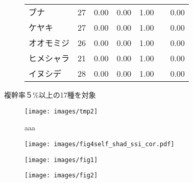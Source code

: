 \documentclass[a0, 30pt, plainboxedsections, draft]{sciposter} %
\renewcommand{\baselinestretch}{1.2}
\begin{document}
\begin{multicols}{2}
\begin{mdframed}[style=subsection.frame,frametitle={\textbf{\huge{\ding{192}}\LARGE{25種の株構造は種間で大きく異なる}}}]
\begin{figure}
\begin{minipage}{0.5\hsize}
\begin{table}
{\begin{tabular}{llrrrr}
\rowcolor{Orange1!30}ブナ &  27 & 0.00 & 0.00 & 1.00 & 0.00 \\ 
\rowcolor{Orange1!30}ケヤキ &  27 & 0.00 & 0.00 & 1.00 & 0.00 \\ 
\rowcolor{Orange1!30}オオモミジ &  26 & 0.00 & 0.00 & 1.00 & 0.00 \\ 
\rowcolor{Orange1!30}ヒメシャラ &  21 & 0.00 & 0.00 & 1.00 & 0.00 \\ 
\rowcolor{Orange1!30}イヌシデ &  28 & 0.00 & 0.00 & 1.00 & 0.00　 \\ 
   \hline
\end{tabular}}
\end{table}
 \end{minipage}
\end{figure}


\end{mdframed}

\renewcommand{\baselinestretch}{0.8}
\begin{mdframed}[style=subsection.frame,frametitle=\textbf{\huge{\ding{194}}\LARGE{萌芽性が強い種ほど自己被陰率が下がる}}]
\renewcommand{\baselinestretch}{1.2}

複幹率５\%以上の17種を対象

\begin{figure}
 \begin{minipage}{0.3\hsize}
  \centering
   \texttt{[image: images/tmp2]}
   
   aaa
 \end{minipage}
 \begin{minipage}{0.67\hsize}
  \centering
   \texttt{[image: images/fig4self\_shad\_ssi\_cor.pdf]}   
 \end{minipage}
\end{figure}

\end{mdframed}

\columnbreak
\renewcommand{\baselinestretch}{0.8}
\begin{mdframed}[style=subsection.frame,frametitle=\textbf{\huge{\ding{193}}\LARGE{萌芽性が強くなるほど樹高が低くなる}}]
\renewcommand{\baselinestretch}{1.2} %

\begin{figure}
	\centering
		\texttt{[image: images/fig1]} %
\end{figure}

\begin{figure}
	\centering
		\texttt{[image: images/fig2]} %
\end{figure}

\end{mdframed}

\end{multicols}

\end{document}
